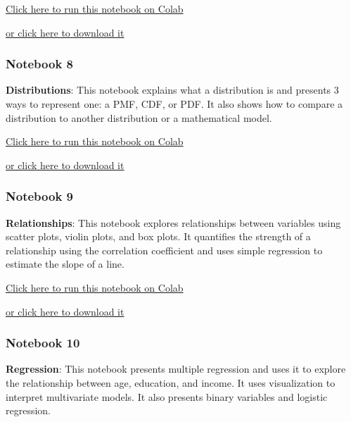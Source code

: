 \href{https://colab.research.google.com/github/AllenDowney/ElementsOfDataScience/blob/v1/07_dataframes.ipynb}{Click
here to run this notebook on Colab}

\href{https://github.com/AllenDowney/ElementsOfDataScience/raw/v1/07_dataframes.ipynb}{or
click here to download it}

\hypertarget{notebook-8}{%
\subsubsection{Notebook 8}\label{notebook-8}}

\textbf{Distributions}: This notebook explains what a distribution is
and presents 3 ways to represent one: a PMF, CDF, or PDF. It also shows
how to compare a distribution to another distribution or a mathematical
model.

\href{https://colab.research.google.com/github/AllenDowney/ElementsOfDataScience/blob/v1/08_distributions.ipynb}{Click
here to run this notebook on Colab}

\href{https://github.com/AllenDowney/ElementsOfDataScience/raw/v1/08_distributions.ipynb}{or
click here to download it}

\hypertarget{notebook-9}{%
\subsubsection{Notebook 9}\label{notebook-9}}

\textbf{Relationships}: This notebook explores relationships between
variables using scatter plots, violin plots, and box plots. It
quantifies the strength of a relationship using the correlation
coefficient and uses simple regression to estimate the slope of a line.

\href{https://colab.research.google.com/github/AllenDowney/ElementsOfDataScience/blob/v1/09_relationships.ipynb}{Click
here to run this notebook on Colab}

\href{https://github.com/AllenDowney/ElementsOfDataScience/raw/v1/09_relationships.ipynb}{or
click here to download it}

\hypertarget{notebook-10}{%
\subsubsection{Notebook 10}\label{notebook-10}}

\textbf{Regression}: This notebook presents multiple regression and uses
it to explore the relationship between age, education, and income. It
uses visualization to interpret multivariate models. It also presents
binary variables and logistic regression.

